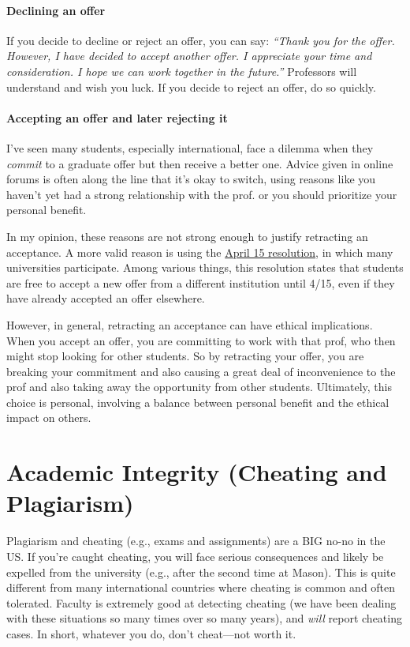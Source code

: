 \documentclass[oneside,11pt,dvipsnames]{book}
\begin{document}
\paragraph{Declining an offer} If you decide to decline or reject an offer, you can say: \emph{``Thank you for the offer. However, I have decided to accept another offer.  I appreciate your time and consideration.  I hope we can work together in the future.''}  Professors will understand and wish you luck.  If you decide to reject an offer, do so quickly.


\paragraph{Accepting an offer and later rejecting it}

I've seen many students, especially international, face a dilemma when they \emph{commit} to a graduate offer but then receive a better one. Advice given in online forums is often along the line that it's okay to switch, using reasons like you haven't yet had a strong relationship with the prof. or you should prioritize your personal benefit.

In my opinion, these reasons are not strong enough to justify retracting an acceptance. A more valid reason is using the \href{https://cgsnet.org/wp-content/uploads/2024/01/CGS_April15_Resolution_Jan312024.pdf}{April 15 resolution}, in which many universities participate. Among various things, this resolution states that students are free to accept a new offer from a different institution until 4/15, even if they have already accepted an offer elsewhere. 

However, in general, retracting an acceptance can have ethical implications. When you accept an offer, you are committing to work with that prof, who then might stop looking for other students. So by retracting your offer, you are breaking your commitment and also causing a great deal of inconvenience to the prof and also taking away the opportunity from other students. 
Ultimately, this choice is personal, involving a balance between personal benefit and the ethical impact on others. 

\section{Academic Integrity (Cheating and Plagiarism)}

Plagiarism and cheating (e.g., exams and assignments) are a BIG no-no in the US.  If you're caught cheating, you will face serious consequences and likely be expelled from the university (e.g., after the second time at Mason).   This is quite different from many international countries where cheating is common and often tolerated.  Faculty is extremely good at detecting cheating (we have been dealing with these situations so many times over so many years), and \emph{will} report cheating cases.  In short, whatever you do, don't cheat---not worth it.
\end{document}
